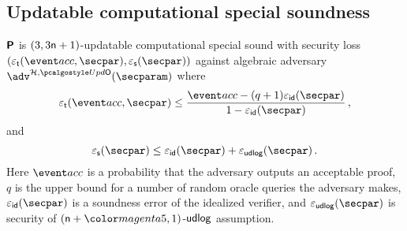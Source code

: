 \subsection{Updatable computational special soundness}
\begin{lemma}
	\label{lem:plonkprot_ss}
  $\bm{\mathsf{P}}$ is $(3, 3 \mathsf{n} + 1)$-updatable computational special sound with security loss $(\epst(\accProb, \secpar), \epss(\secpar))$ against algebraic adversary $\adv^{\ro, \initU} (\secparam)$ where
  \[
    \epst(\accProb, \secpar) \leq \frac{\accProb - (q + 1) \epsid (\secpar)}{1 - \epsid (\secpar)}\,,
  \]
  and
	\[
	  \epss(\secpar) \leq \epsid(\secpar) + \epsudlog(\secpar) \,.
	\]
	Here $\accProb$ is a probability that the adversary outputs an acceptable proof, $q$ is the upper bound for a number of random oracle queries the adversary makes, $\epsid(\secpar)$ is a soundness error of the idealized verifier, and $\epsudlog(\secpar)$ is security of $(\numberofconstrains + \changedm{5}, 1)$-$\mathsf{udlog}$ %
	assumption.
\end{lemma}

